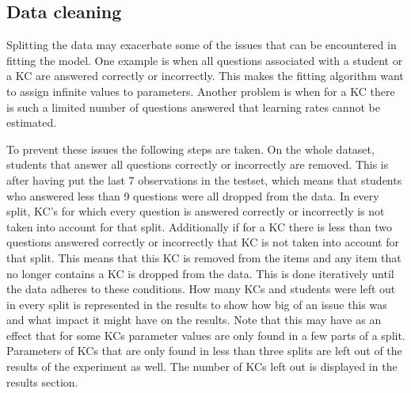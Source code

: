 \documentclass{scrartcl}
\begin{document}
\subsection{Data cleaning}
\label{sec:cleaning}
Splitting the data may exacerbate some of the issues that can be encountered in fitting the model. One example is when all questions associated with a student or a KC are answered correctly or incorrectly. This makes the fitting algorithm want to assign infinite values to parameters. Another problem is when for a KC there is such a limited number of questions answered that learning rates cannot be estimated.

To prevent these issues the following steps are taken. On the whole dataset, students that answer all questions correctly or incorrectly are removed. This is after having put the last 7 observations in the testset, which means that students who answered less than 9 questions were all dropped from the data. 
In every split, KC's for which every question is answered correctly or incorrectly is not taken into account for that split. Additionally if for a KC there is less than two questions answered correctly or incorrectly that KC is not taken into account for that split. This means that this KC is removed from the items and any item that no longer contains a KC is dropped from the data. This is done iteratively until the data adheres to these conditions. How many KCs and students were left out in every split is represented in the results to show how big of an issue this was and what impact it might have on the results.
Note that this may have as an effect that for some KCs parameter values are only found in a few parts of a split. Parameters of KCs that are only found in less than three splits are left out of the results of the experiment as well. The number of KCs left out is displayed in the results section.
\end{document}
